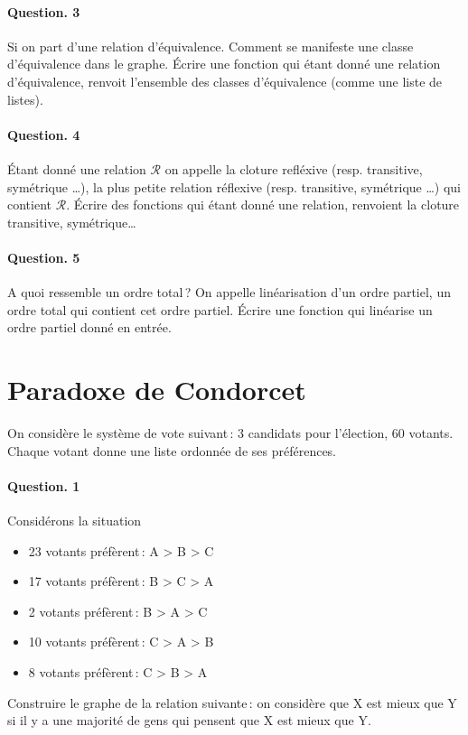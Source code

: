 \documentclass[10pt,a4paper]{article}
\begin{document}
\paragraph{Question. 3\\}
Si on part d'une relation d'équivalence. Comment se manifeste une classe
d'équivalence dans le graphe. Écrire une fonction qui étant donné une
relation d'équivalence, renvoit l'ensemble des classes d'équivalence
(comme une liste de listes).

\paragraph{Question. 4\\}
Étant donné une relation $\mathcal{R}$ on appelle la cloture refléxive (resp. transitive,
symétrique \dots), la plus petite relation réflexive (resp. transitive,
symétrique \dots) qui contient $\mathcal{R}$. Écrire des fonctions qui
étant donné une relation, renvoient la cloture transitive, symétrique\dots

\paragraph{Question. 5\\}
A quoi ressemble un ordre total\,? On appelle linéarisation d'un ordre
partiel, un ordre total qui contient cet ordre partiel. Écrire une
fonction qui linéarise un ordre partiel donné en entrée.
 
\section{Paradoxe de Condorcet}
On considère le système de vote suivant\,: 3 candidats pour l'élection,
60 votants. Chaque votant donne une liste ordonnée de ses préférences.
\paragraph{Question. 1\\}
Considérons la situation         
\begin{itemize}
\item 23 votants préfèrent\,: A > B > C
\item 17 votants préfèrent\,: B > C > A
\item 2 votants préfèrent\,: B > A > C
\item 10 votants préfèrent\,: C > A > B
\item 8 votants préfèrent\,: C > B > A
\end{itemize}
Construire le graphe de la relation suivante\,: on considère que X est
mieux que Y si il y a une majorité de gens qui pensent que X est mieux
que Y.
\end{document}
